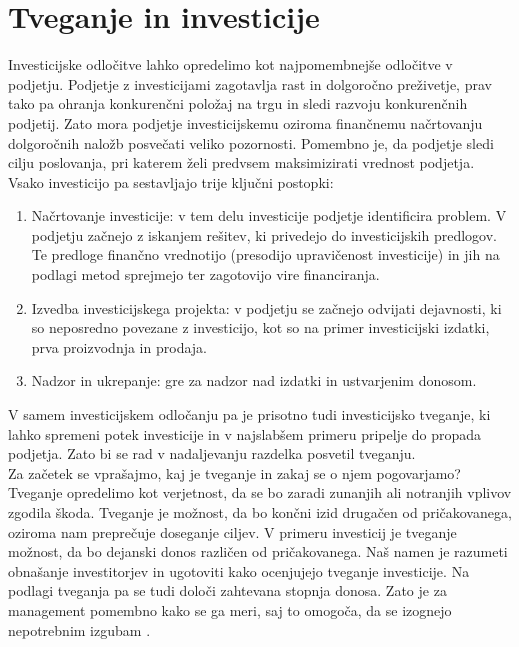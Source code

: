 \section {Tveganje in investicije}
Investicijske odločitve lahko opredelimo kot najpomembnejše odločitve v podjetju. Podjetje z investicijami zagotavlja rast in dolgoročno preživetje, prav tako pa ohranja konkurenčni položaj na trgu in  sledi razvoju konkurenčnih podjetij. Zato mora podjetje investicijskemu oziroma finančnemu načrtovanju dolgoročnih naložb posvečati veliko pozornosti. Pomembno je, da podjetje sledi cilju poslovanja, pri katerem želi predvsem maksimizirati vrednost podjetja. Vsako investicijo pa sestavljajo trije ključni postopki:
\begin{enumerate}
\item{Načrtovanje investicije}: v tem delu investicije podjetje identificira problem. V podjetju začnejo z iskanjem rešitev, ki privedejo do investicijskih predlogov. Te predloge finančno vrednotijo (presodijo upravičenost investicije) in jih na podlagi metod sprejmejo ter zagotovijo vire financiranja.
\item{Izvedba investicijskega projekta}: v podjetju se začnejo odvijati dejavnosti, ki so neposredno povezane z investicijo, kot so na primer investicijski izdatki, prva proizvodnja in prodaja.
\item{Nadzor in ukrepanje}: gre za nadzor nad izdatki in ustvarjenim donosom.
\end{enumerate}

V samem investicijskem odločanju pa je prisotno tudi investicijsko tveganje, ki lahko spremeni potek investicije in v najslabšem primeru pripelje do propada podjetja. Zato bi se rad v nadaljevanju razdelka posvetil tveganju.\\

Za začetek se vprašajmo, kaj je tveganje in zakaj se o njem pogovarjamo?\\
Tveganje opredelimo kot verjetnost, da se bo zaradi zunanjih ali notranjih vplivov zgodila škoda. Tveganje je možnost, da bo končni izid drugačen od pričakovanega, oziroma nam preprečuje doseganje ciljev. V primeru investicij je tveganje možnost, da bo dejanski donos različen od pričakovanega. Naš namen je razumeti obnašanje investitorjev in ugotoviti kako ocenjujejo tveganje investicije. Na podlagi tveganja pa se tudi določi zahtevana stopnja donosa. Zato je za management pomembno kako se ga meri, saj to omogoča, da se izognejo nepotrebnim izgubam \cite{investopedia}. \\

